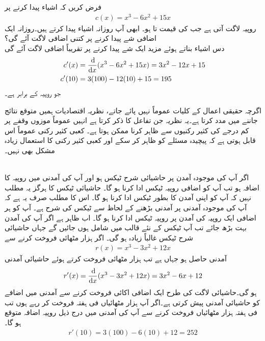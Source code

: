 فرض کریں کہ   اشیاء پیدا کرنے  پر
\begin{align*}
c(x)=x^3-6x^2+15x
\end{align*}
روپیہ لاگت آتی ہے جب  کی قیمت  تا  ہو۔ ابھی آپ روزانہ  اشیاء پیدا کرتے ہیں۔روزانہ ایک اضافی شے   پیدا کرنے پر کتنی   اضافی لاگت آئے گی؟\\
دس اشیاء بناتے ہوئے مزید ایک شے پیدا کرنے پر تقریباً  اضافی لاگت آئے گی
\begin{align*}
c'(x)&=\frac{\dif}{\dif x}(x^3-6x^2+15x)=3x^2-12x+15\\
c'(10)&=3(100)-12(10)+15=195
\end{align*}
جو  روپیہ کے برابر ہے۔


اگرچہ حقیقی اعمال کے کلیات عموماً نہیں پائے جاتے، نظریہ اقتصادیات ہمیں متوقع نتائج جاننے میں مدد کرتا ہے۔یہ نظریہ جن تفاعل کا ذکر کرتا ہے انہیں عموماً موزوں وقفے پر کم درجے کی کثیر رکنیوں سے ظاہر کرنا ممکن ہوتا ہے۔ کعبی کثیر رکنی عموماً اس قابل ہوتی ہے کہ پیچیدہ مسئلے کو ظاہر کر سکے اور کعبی کثیر رکنی  کا  استعمال  زیادہ مشکل بھی نہیں۔ 

\\
اگر آپ کی موجودہ آمدن پر حاشیائی شرح ٹیکس  ہو اور آپ کی آمدنی میں  روپیہ کا اضافہ ہو تب آپ کو اضافی  روپیہ ٹیکس ادا کرنا ہو گا۔   حاشیائی ٹیکس کا   ہرگز  یہ مطلب نہیں  کہ آپ کو اپنی آمدن کا  بطور ٹیکس ادا کرنا ہو گا۔ اس کا مطلب صرف یہ ہے کہ آپ کی موجودہ آمدنی  پر آمدنی بڑھنے کے لحاظ سے ٹیکس کی شرح  ہے۔ آپ کو ہر اضافی ایک روپیہ کی آمدن پر  روپیہ ٹیکس ادا کرنا ہو گا۔ اب ظاہر ہے  اگر آپ کی آمدن بہت بڑھ جائے تب آپ ٹیکس کے نئے قالب میں شامل ہوں جائیں گے جہاں حاشیائی شرح ٹیکس غالباً زیادہ ہو گی۔  
اگر  ہزار مٹھائی فروخت کرنے سے 
\begin{align*}
r(x)=x^3-3x^2+12x
\end{align*}
آمدنی حاصل ہو جہاں  ہے تب  ہزار مٹھائی فروخت کرتے ہوئے حاشیائی آمدنی
\begin{align*}
r'(x)=\frac{\dif}{\dif x}(x^3-3x^2+12x)=3x^2-6x+12
\end{align*}
ہو گی۔حاشیائی لاگت کی طرح ایک اضافی اکائی فروخت کرنے سے آمدنی میں اضافے  کو حاشیائی آمدنی پیش کرتی ہے۔اگر آپ  ہزار مٹھائیاں فی ہفتہ فروخت کر رہے ہوں تب فی ہفتہ  ہزار مٹھائیاں فروخت کرنے سے آپ کی آمدنی میں درج ذیل روپیہ اضافہ متوقع ہو گا۔ 
\begin{align*}
r'(10)=3(100)-6(10)+12=252
\end{align*} 

